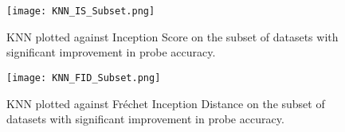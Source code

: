 \documentclass[../../thesis.tex]{subfiles}
\begin{document}
\begin{figure}[h]
    \texttt{[image: KNN\_IS\_Subset.png]}
    \centering  
    \caption{KNN plotted against Inception Score on the subset of datasets with significant improvement in probe accuracy.}
    \label{fig:KNN_IS_Subset}
\end{figure}

\begin{figure}[h]
    \texttt{[image: KNN\_FID\_Subset.png]}
    \centering  
    \caption{KNN plotted against Fréchet Inception Distance on the subset of datasets with significant improvement in probe accuracy.}
    \label{fig:KNN_FID_Subset}
\end{figure}













\end{document}
